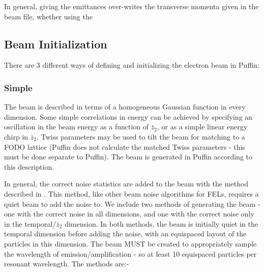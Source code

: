 \documentclass[12pt]{article}%
\begin{document}
In general, giving the emittances over-writes the transverse momenta given in the beam file, whether using the














\subsection{Beam Initialization}
\label{beamfls}
There are 3 different ways of defining and initializing the electron beam in Puffin:

\subsubsection{Simple}

The beam is described in terms of a homogeneous Gaussian function in every dimension. Some simple correlations in energy can be achieved by specifying an oscillation in the beam energy as a function of $\bar{z}_2$, or as a simple linear energy chirp in $\bar{z}_2$. Twiss parameters may be used to tilt the beam for matching to a FODO lattice (Puffin does not calculate the matched Twiss parameters - this must be done separate to Puffin). The beam is generated in Puffin according to this description.

In general, the correct noise statistics are added to the beam with the method described in \cite{noise1}. This method, like other beam noise algorithms for FELs, requires a quiet beam to add the noise to. We include two methods of generating the beam - one with the correct noise in all dimensions, and one with the correct noise only in the temporal/$\bar{z}_2$ dimension. In both methods, the beam is initially quiet in the temporal dimension before adding the noise, with an equispaced layout of the particles in this dimension. The beam MUST be created to appropriately sample the wavelength of emission/amplification - so at least 10 equispaced particles per resonant wavelength. The methods are:-

\end{document}
